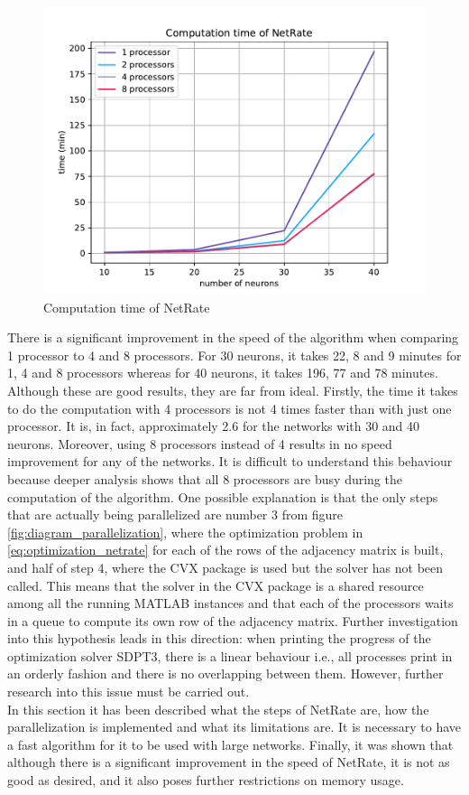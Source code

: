 \begin{figure}
\centering
\includegraphics[width=0.8\linewidth]{computation_time_netrate.pdf}
\caption{Computation time of NetRate}
\label{fig:speed_netrate}
\end{figure}

There is a significant improvement in the speed of the algorithm when comparing 1 processor to 4 and 8 processors. For 30 neurons, it takes 22, 8 and 9 minutes for 1, 4 and 8 processors whereas for 40 neurons, it takes 196, 77 and 78 minutes. Although these are good results, they are far from ideal. 
Firstly, the time it takes to do the computation with 4 processors is not 4 times faster than with just one processor. It is, in fact, approximately 2.6 for the networks with 30 and 40 neurons. 
Moreover, using 8 processors instead of 4 results in no speed improvement for any of the networks. It is difficult to understand this behaviour because deeper analysis shows that all 8 processors are busy during the computation of the algorithm. One possible explanation is that the only steps that are actually being parallelized are number 3 from figure \ref{fig:diagram_parallelization}, where the optimization problem in \ref{eq:optimization_netrate} for each of the rows of the adjacency matrix is built, and half of step 4, where the CVX package is used but the solver has not been called. This means that the solver in the CVX package is a shared resource among all the running MATLAB instances and that each of the processors waits in a queue to compute its own row of the adjacency matrix. Further investigation into this hypothesis leads in this direction: when printing the progress of the optimization solver SDPT3, there is a linear behaviour i.e., all processes print in an orderly fashion and there is no overlapping between them. However, further research into this issue must be carried out.\\

In this section it has been described what the steps of NetRate are, how the parallelization is implemented and what its limitations are. It is necessary to have a fast algorithm for it to be used with large networks. Finally, it was shown that although there is a significant improvement in the speed of NetRate, it is not as good as desired, and it also poses further restrictions on memory usage.  
